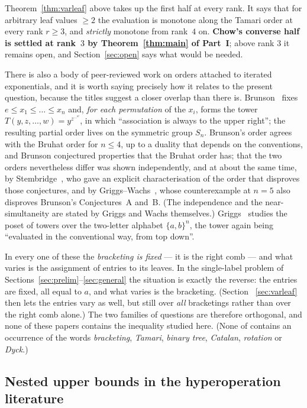 \documentclass[11pt,a4paper]{article}
\theoremstyle{plain}
\theoremstyle{definition}
\begin{document}
Theorem~\ref{thm:varleaf} above takes up the first half at every rank. It says that
for arbitrary leaf values $\ge2$ the evaluation is monotone along the Tamari order at
every rank $r\ge3$, and \emph{strictly} monotone from rank~$4$ on. \textbf{Chow's
converse half is settled at rank~$3$ by Theorem~\ref{thm:main} of Part~I}; above rank
$3$ it remains open, and Section~\ref{sec:open} says what would be needed.

There is also a body of peer-reviewed work on orders attached to iterated
exponentials, and it is worth saying precisely how it relates to the present question,
because the titles suggest a closer overlap than there is. Brunson~\cite{Bru} fixes
$e\le x_1\le\dots\le x_n$ and, \emph{for each permutation} of the $x_i$, forms the
tower $T(y,z,\dots,w)=y^{z^{\cdots^{w}}}$, in which ``association is always to the
upper right''; the resulting partial order lives on the symmetric group $S_n$.
Brunson's order agrees with the Bruhat order for $n\le4$, up to a duality that depends
on the conventions, and Brunson conjectured properties that the Bruhat order has; that
the two orders nevertheless differ was shown independently, and at about the same time,
by Stembridge~\cite{Ste}, who gave an explicit characterisation of the order that
disproves those conjectures, and by Griggs--Wachs~\cite{GW}, whose counterexample at
$n=5$ also disproves Brunson's Conjectures~A and~B. (The independence and the
near-simultaneity are stated by Griggs and Wachs themselves.)
Griggs~\cite{Gri} studies the poset of towers over the two-letter alphabet
$\{a,b\}^n$, the tower again being ``evaluated in the conventional way, from top
down''.

In every one of these the \emph{bracketing is fixed} --- it is the right comb --- and
what varies is the assignment of entries to its leaves. In the single-label problem of
Sections~\ref{sec:prelim}--\ref{sec:general} the situation is exactly the reverse: the
entries are fixed, all equal to $a$, and what varies is the bracketing. (Section~%
\ref{sec:varleaf} then lets the entries vary as well, but still over \emph{all}
bracketings rather than over the right comb alone.) The two families of questions are therefore orthogonal, and none of these
papers contains the inequality studied here. (None of \cite{Bru,Gri,GW} contains an
occurrence of the words \emph{bracketing}, \emph{Tamari}, \emph{binary tree},
\emph{Catalan}, \emph{rotation} or \emph{Dyck}.)

\subsection{Nested upper bounds in the hyperoperation literature}
\end{document}
